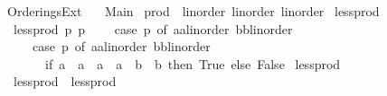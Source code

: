 %
\begin{isabellebody}%
%
%
\isadeliminvisible
%
\endisadeliminvisible
%
\isataginvisible
{}\isamarkupfalse%
\ Orderings{\isacharunderscore}{\kern0pt}Ext\isanewline
\ \ \ Main\isanewline
{}\isanewline
\isanewline
{}\isamarkupfalse%
\ prod\ {\isacharcolon}{\kern0pt}{\isacharcolon}{\kern0pt}\ {\isacharparenleft}{\kern0pt}linorder{\isacharcomma}{\kern0pt}\ linorder{\isacharparenright}{\kern0pt}\ linorder\isanewline
{}\isanewline
\isanewline
{}\isamarkupfalse%
\ less{\isacharunderscore}{\kern0pt}prod{\isacharprime}{\kern0pt}\ \isanewline
\ \ {\isachardoublequoteopen}less{\isacharunderscore}{\kern0pt}prod{\isacharprime}{\kern0pt}\ p{}\ p{}\ {\isasymequiv}\isanewline
\ \ \ case\ p{}\ of\ {\isacharparenleft}{\kern0pt}a{}{\isacharcolon}{\kern0pt}{\isacharcolon}{\kern0pt}{\isacharprime}{\kern0pt}a{\isacharcolon}{\kern0pt}{\isacharcolon}{\kern0pt}linorder{\isacharcomma}{\kern0pt}\ b{}{\isacharcolon}{\kern0pt}{\isacharcolon}{\kern0pt}{\isacharprime}{\kern0pt}b{\isacharcolon}{\kern0pt}{\isacharcolon}{\kern0pt}linorder{\isacharparenright}{\kern0pt}\ {\isasymRightarrow}\isanewline
\ \ \ \ \ case\ p{}\ of\ {\isacharparenleft}{\kern0pt}a{}{\isacharcolon}{\kern0pt}{\isacharcolon}{\kern0pt}{\isacharprime}{\kern0pt}a{\isacharcolon}{\kern0pt}{\isacharcolon}{\kern0pt}linorder{\isacharcomma}{\kern0pt}\ b{}{\isacharcolon}{\kern0pt}{\isacharcolon}{\kern0pt}{\isacharprime}{\kern0pt}b{\isacharcolon}{\kern0pt}{\isacharcolon}{\kern0pt}linorder{\isacharparenright}{\kern0pt}\ {\isasymRightarrow}\isanewline
\ \ \ \ \ \ \ if\ {\isacharparenleft}{\kern0pt}a{}\ {\isacharless}{\kern0pt}\ a{}{\isacharparenright}{\kern0pt}\ {\isasymor}\ {\isacharparenleft}{\kern0pt}a{}\ {\isacharequal}{\kern0pt}\ a{}\ {\isasymand}\ b{}\ {\isacharless}{\kern0pt}\ b{}{\isacharparenright}{\kern0pt}\ then\ True\ else\ False{\isachardoublequoteclose}\isanewline
\isanewline
{}\isamarkupfalse%
\ less{\isacharunderscore}{\kern0pt}prod\ \isanewline
\ \ {\isachardoublequoteopen}less{\isacharunderscore}{\kern0pt}prod\ {\isasymequiv}\ less{\isacharunderscore}{\kern0pt}prod{\isacharprime}{\kern0pt}{\isachardoublequoteclose}\isanewline
\isanewline
{}\isamarkupfalse%

\end{isabellebody}
